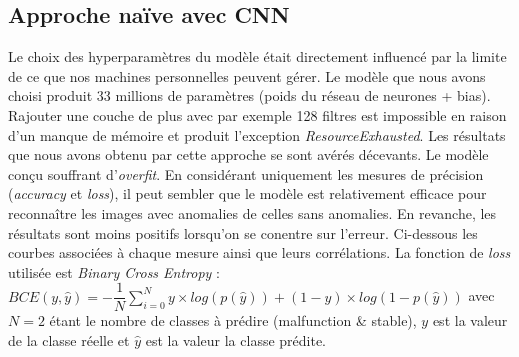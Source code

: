 \documentclass[french]{article}
\theoremstyle{mytheoremstyle}
\theoremstyle{mytheoremstyle}
\theoremstyle{myproblemstyle}
\begin{document}
    \subsection{Approche naïve avec CNN}
    Le choix des hyperparamètres du modèle était directement influencé par la limite de ce que nos machines personnelles peuvent gérer. Le modèle que nous avons choisi produit 33 millions de paramètres (poids du réseau de neurones + bias). Rajouter une couche de plus avec par exemple 128 filtres est impossible en raison d'un manque de mémoire et produit l'exception \textit{ResourceExhausted}.
    \newline
    \indent Les résultats que nous avons obtenu par cette approche se sont avérés décevants. Le modèle conçu souffrant d'\emph{overfit}. En considérant uniquement les mesures de précision (\emph{accuracy} et \emph{loss}), il peut sembler que le modèle est relativement efficace pour reconnaître les images avec anomalies de celles sans anomalies. En revanche, les résultats sont moins positifs lorsqu'on se conentre sur l'erreur. Ci-dessous les courbes associées à chaque mesure ainsi que leurs corrélations. La fonction de \emph{loss} utilisée est \textit{Binary Cross Entropy} : $BCE(y, \hat{y}) = -\dfrac{1}{N} \sum\limits_{i=0}^{N} y \times log(p(\hat{y})) + (1-y) \times log(1-p(\hat{y}))$ avec $N=2$ étant le nombre de classes à prédire (malfunction \& stable), $y$ est la valeur de la classe réelle et $\hat{y}$ est la valeur la classe prédite.
    
\end{document}
